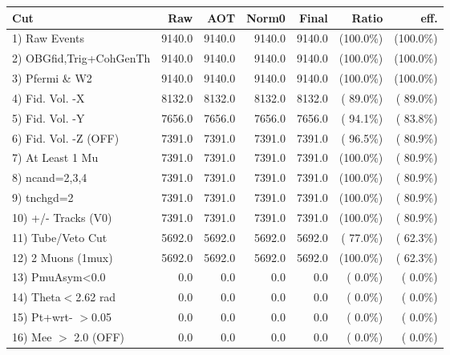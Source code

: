  \begin{table}[h!]\centering
 \begin{tabular}{||l||r|r|r|r|r|r||}
 \hline
 \hline
 Cut & Raw & AOT & Norm0 & Final & Ratio & eff.       \\
 \hline
  1) Raw Events           &       9140.0 &       9140.0 &       9140.0 &       9140.0 & (100.0\%) & (100.0\%) \\
  2) OBGfid,Trig+CohGenTh &       9140.0 &       9140.0 &       9140.0 &       9140.0 & (100.0\%) & (100.0\%) \\
  3) Pfermi \& W2         &       9140.0 &       9140.0 &       9140.0 &       9140.0 & (100.0\%) & (100.0\%) \\
  4) Fid. Vol. -X         &       8132.0 &       8132.0 &       8132.0 &       8132.0 & ( 89.0\%) & ( 89.0\%) \\
  5) Fid. Vol. -Y         &       7656.0 &       7656.0 &       7656.0 &       7656.0 & ( 94.1\%) & ( 83.8\%) \\
  6) Fid. Vol. -Z (OFF)   &       7391.0 &       7391.0 &       7391.0 &       7391.0 & ( 96.5\%) & ( 80.9\%) \\
  7) At Least 1 Mu        &       7391.0 &       7391.0 &       7391.0 &       7391.0 & (100.0\%) & ( 80.9\%) \\
  8) ncand=2,3,4          &       7391.0 &       7391.0 &       7391.0 &       7391.0 & (100.0\%) & ( 80.9\%) \\
  9) tnchgd=2             &       7391.0 &       7391.0 &       7391.0 &       7391.0 & (100.0\%) & ( 80.9\%) \\
 10) +/- Tracks (V0)      &       7391.0 &       7391.0 &       7391.0 &       7391.0 & (100.0\%) & ( 80.9\%) \\
 11) Tube/Veto Cut        &       5692.0 &       5692.0 &       5692.0 &       5692.0 & ( 77.0\%) & ( 62.3\%) \\
 12) 2 Muons (1mux)       &       5692.0 &       5692.0 &       5692.0 &       5692.0 & (100.0\%) & ( 62.3\%) \\
 13) PmuAsym<0.0          &          0.0 &          0.0 &          0.0 &          0.0 & (  0.0\%) & (  0.0\%) \\
 14) Theta$<$2.62 rad     &          0.0 &          0.0 &          0.0 &          0.0 & (  0.0\%) & (  0.0\%) \\
 15) Pt+wrt- $>$0.05      &          0.0 &          0.0 &          0.0 &          0.0 & (  0.0\%) & (  0.0\%) \\
 16) Mee $>$ 2.0  (OFF)   &          0.0 &          0.0 &          0.0 &          0.0 & (  0.0\%) & (  0.0\%) \\

\end{tabular}
\end{table}
